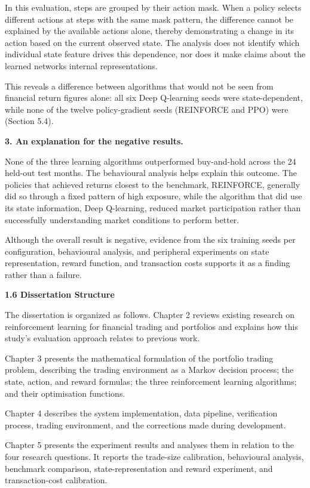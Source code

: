 In this evaluation, steps are grouped by their action mask. When a
policy selects different actions at steps with the same mask pattern,
the difference cannot be explained by the available actions alone,
thereby demonstrating a change in its action based on the current
observed state. The analysis does not identify which individual state
feature drives this dependence, nor does it make claims about the
learned network\textquotesingle s internal representations.

This reveals a difference between algorithms that would not be seen from
financial return figures alone: all six Deep Q-learning seeds were
state-dependent, while none of the twelve policy-gradient seeds
(REINFORCE and PPO) were (Section 5.4).

\textbf{3. An explanation for the negative results.}

None of the three learning algorithms outperformed buy-and-hold across
the 24 held-out test months. The behavioural analysis helps explain this
outcome. The policies that achieved returns closest to the benchmark,
REINFORCE, generally did so through a fixed pattern of high exposure,
while the algorithm that did use its state information, Deep Q-learning,
reduced market participation rather than successfully understanding
market conditions to perform better.

Although the overall result is negative, evidence from the six training
seeds per configuration, behavioural analysis, and peripheral
experiments on state representation, reward function, and transaction
costs supports it as a finding rather than a failure.

\textbf{1.6 Dissertation Structure}

The dissertation is organized as follows. Chapter 2 reviews existing
research on reinforcement learning for financial trading and portfolios
and explains how this study's evaluation approach relates to previous
work.

Chapter 3 presents the mathematical formulation of the portfolio trading
problem, describing the trading environment as a Markov decision
process; the state, action, and reward formulas; the three reinforcement
learning algorithms; and their optimisation functions.

Chapter 4 describes the system implementation, data pipeline,
verification process, trading environment, and the corrections made
during development.

Chapter 5 presents the experiment results and analyses them in relation
to the four research questions. It reports the trade-size calibration,
behavioural analysis, benchmark comparison, state-representation and
reward experiment, and transaction-cost calibration.

